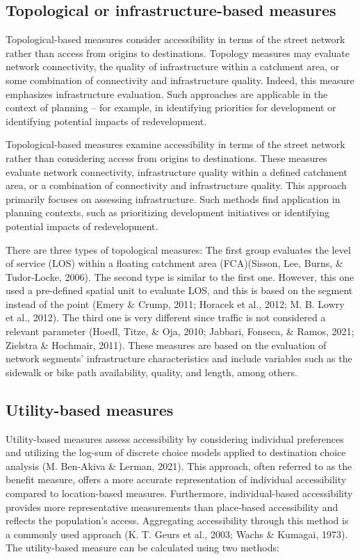 \documentclass[
11pt, %
oneside, %
english, %
singlespacing, %
]{macthesis} %
\begin{document}
\subsection{Topological or infrastructure-based measures}\label{topological-or-infrastructure-based-measures}

Topological-based measures consider accessibility in terms of the street network rather than access from origins to destinations. Topology measures may evaluate network connectivity, the quality of infrastructure within a catchment area, or some combination of connectivity and infrastructure quality. Indeed, this measure emphasizes infrastructure evaluation. Such approaches are applicable in the context of planning -- for example, in identifying priorities for development or identifying potential impacts of redevelopment.

Topological-based measures examine accessibility in terms of the street network rather than considering access from origins to destinations. These measures evaluate network connectivity, infrastructure quality within a defined catchment area, or a combination of connectivity and infrastructure quality. This approach primarily focuses on assessing infrastructure. Such methods find application in planning contexts, such as prioritizing development initiatives or identifying potential impacts of redevelopment.

There are three types of topological measures: The first group evaluates the level of service (LOS) within a floating catchment area (FCA)(Sisson, Lee, Burns, \& Tudor-Locke, 2006). The second type is similar to the first one. However, this one used a pre-defined spatial unit to evaluate LOS, and this is based on the segment instead of the point (Emery \& Crump, 2011; Horacek et al., 2012; M. B. Lowry et al., 2012). The third one is very different since traffic is not considered a relevant parameter (Hoedl, Titze, \& Oja, 2010; Jabbari, Fonseca, \& Ramos, 2021; Zielstra \& Hochmair, 2011). These measures are based on the evaluation of network segments' infrastructure characteristics and include variables such as the sidewalk or bike path availability, quality, and length, among others.

\subsection{Utility-based measures}\label{utility-based-measures}

Utility-based measures assess accessibility by considering individual preferences and utilizing the log-sum of discrete choice models applied to destination choice analysis (M. Ben-Akiva \& Lerman, 2021). This approach, often referred to as the benefit measure, offers a more accurate representation of individual accessibility compared to location-based measures. Furthermore, individual-based accessibility provides more representative measurements than place-based accessibility and reflects the population's access. Aggregating accessibility through this method is a commonly used approach (K. T. Geurs et al., 2003; Wachs \& Kumagai, 1973). The utility-based measure can be calculated using two methods:
\end{document}
